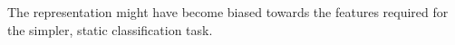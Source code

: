The representation might have become biased towards the features required for the
simpler, static classification task.
